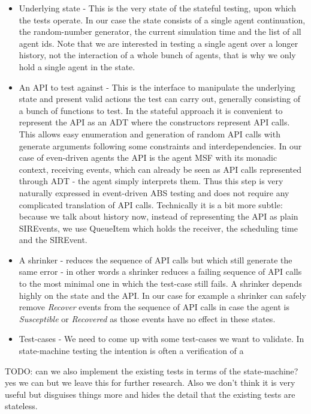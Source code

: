 \begin{itemize}
	\item Underlying state - This is the very state of the stateful testing, upon which the tests operate. In our case the state consists of a single agent continuation, the random-number generator, the current simulation time and the list of all agent ids. Note that we are interested in testing a single agent over a longer history, not the interaction of a whole bunch of agents, that is why we only hold a single agent in the state.
	
	\item An API to test against - This is the interface to manipulate the underlying state and present valid actions the test can carry out, generally consisting of a bunch of functions to test. In the stateful approach it is convenient to represent the API as an ADT where the constructors represent API calls. This allows easy enumeration and generation of random API calls with generate arguments following some constraints and interdependencies. In our case of even-driven agents the API is the agent MSF with its monadic context, receiving events, which can already be seen as API calls represented through ADT - the agent simply interprets them. Thus this step is very naturally expressed in event-driven ABS testing and does not require any complicated translation of API calls. Technically it is a bit more subtle: because we talk about history now, instead of representing the API as plain SIREvents, we use QueueItem which holds the receiver, the scheduling time and the SIREvent.
	
	\item A shrinker - reduces the sequence of API calls but which still generate the same error - in other words a shrinker reduces a failing sequence of API calls to the most minimal one in which the test-case still fails. A shrinker depends highly on the state and the API. In our case for example a shrinker can safely remove \textit{Recover} events from the sequence of API calls in case the agent is \textit{Susceptible} or \textit{Recovered} as those events have no effect in these states.
	
	\item Test-cases - We need to come up with some test-cases we want to validate. In state-machine testing the intention is often a verification of a 
\end{itemize}


TODO: can we also implement the existing tests in terms of the state-machine? yes we can but we leave this for further research. Also we don't think it is very useful but disguises things more and hides the detail that the existing tests are stateless.
